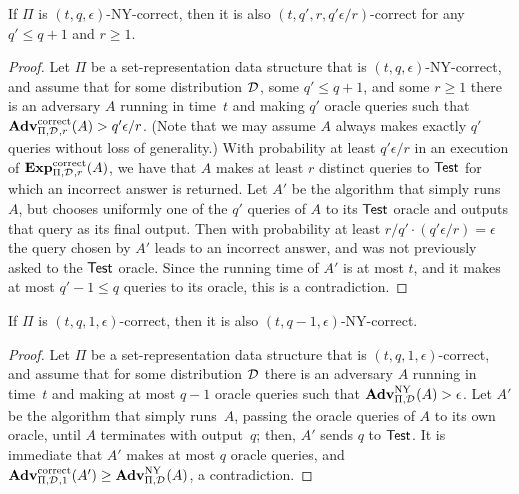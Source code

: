\begin{theorem}
If $\Pi$ is $(t,q,\epsilon)$-NY-correct, then it is also
$(t, q', r, q'\epsilon/r)$-correct for any $q' \leq q+1$ and $r\geq
1$.
\end{theorem}
\begin{proof}
Let $\Pi$ be a set-representation data structure that is $(t,q,\epsilon)$-NY-correct,
and assume that for some distribution $\mathcal{D}_{}^{}$, some $q' \leq q+1$, and
some $r \geq 1$
there is an adversary $A$ running in time~$t$
and making $q'$ oracle queries such that
$\mathrm{\mathbf{Adv}}^{\mathrm{correct}}_{\Pi,\mathcal{D}_{}^{},r}(A) > q'\epsilon/r$.
(Note that
we may assume $A$ always makes exactly $q'$ queries without loss of generality.)
With probability at least
$q'\epsilon/r$ in an execution of $\mathrm{\mathbf{Exp}}^{\mathrm{correct}}_{\Pi,\mathcal{D}_{}^{},r}(A)$, we have that
$A$ makes at least $r$ distinct queries to $\mathsf{Test}$ for which
an incorrect answer is returned. Let $A'$ be the algorithm that simply
runs~$A$, but chooses
uniformly one of the $q'$ queries of $A$ to its $\mathsf{Test}$ oracle and outputs that query
as its final output. Then with probability at least $r/q' \cdot (q'\epsilon/r)=\epsilon$
the query chosen by $A'$
leads to an incorrect answer, and was not previously asked to the $\mathsf{Test}$ oracle.
Since the running time of $A'$ is at most $t$, and it makes at most $q'-1 \leq q$ queries
to its oracle, this is a contradiction.
\end{proof}


\begin{theorem}
If $\Pi$ is $(t, q, 1, \epsilon)$-correct, then it is also $(t, q-1, \epsilon)$-NY-correct.
\end{theorem}

\begin{proof}
Let $\Pi$ be a set-representation data structure that is $(t,q,1,\epsilon)$-correct,
and assume that for some distribution $\mathcal{D}_{}^{}$
there is an adversary $A$ running in time~$t$
and making at most $q-1$ oracle queries such that
$\mathrm{\mathbf{Adv}}^{\mathrm{NY}}_{\Pi,\mathcal{D}_{}^{}}(A) > \epsilon$.
Let $A'$ be the algorithm that simply
runs~$A$, passing the oracle queries of $A$ to its own oracle, until $A$ terminates
with output~$q$; then, $A'$ sends $q$ to $\mathsf{Test}$.  It is immediate that $A'$ makes at most $q$ oracle queries, and
$\mathrm{\mathbf{Adv}}^{\mathrm{correct}}_{\Pi,\mathcal{D}_{}^{},1}(A') \geq \mathrm{\mathbf{Adv}}^{\mathrm{NY}}_{\Pi,\mathcal{D}_{}^{}}(A)$, a contradiction.
\end{proof}

